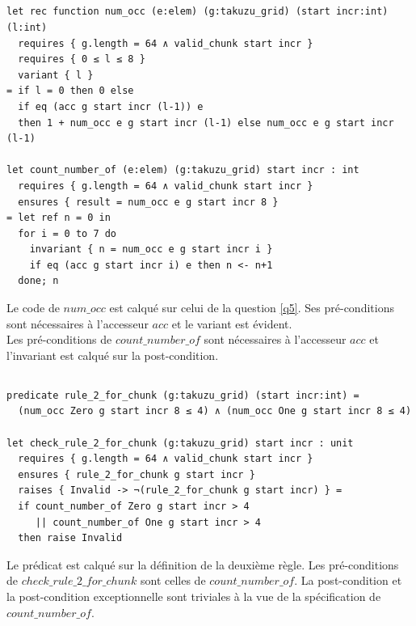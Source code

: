 ﻿\documentclass[10pt,a4paper]{article}
\begin{document}
\subsection{}
\begin{verbatim}
let rec function num_occ (e:elem) (g:takuzu_grid) (start incr:int) (l:int)
  requires { g.length = 64 ∧ valid_chunk start incr }
  requires { 0 ≤ l ≤ 8 }
  variant { l }
= if l = 0 then 0 else
  if eq (acc g start incr (l-1)) e
  then 1 + num_occ e g start incr (l-1) else num_occ e g start incr (l-1)

let count_number_of (e:elem) (g:takuzu_grid) start incr : int
  requires { g.length = 64 ∧ valid_chunk start incr }
  ensures { result = num_occ e g start incr 8 }
= let ref n = 0 in
  for i = 0 to 7 do
    invariant { n = num_occ e g start incr i }
    if eq (acc g start incr i) e then n <- n+1
  done; n
\end{verbatim}

Le code de $num\_occ$ est calqué sur celui de la question \ref{q5}. Ses pré-conditions sont nécessaires à l'accesseur $acc$ et le variant est évident.\\
Les pré-conditions de $count\_number\_of$ sont nécessaires à l'accesseur $acc$ et l'invariant est calqué sur la post-condition.

\subsection{}
\begin{verbatim}
predicate rule_2_for_chunk (g:takuzu_grid) (start incr:int) =
  (num_occ Zero g start incr 8 ≤ 4) ∧ (num_occ One g start incr 8 ≤ 4)

let check_rule_2_for_chunk (g:takuzu_grid) start incr : unit
  requires { g.length = 64 ∧ valid_chunk start incr }
  ensures { rule_2_for_chunk g start incr }
  raises { Invalid -> ¬(rule_2_for_chunk g start incr) } =
  if count_number_of Zero g start incr > 4
     || count_number_of One g start incr > 4
  then raise Invalid
\end{verbatim}

Le prédicat est calqué sur la définition de la deuxième règle.
Les pré-conditions de $check\_rule\_2\_for\_chunk$ sont celles de $count\_number\_of$. La post-condition et la post-condition exceptionnelle sont triviales à la vue de la spécification de $count\_number\_of$.
\end{document}

